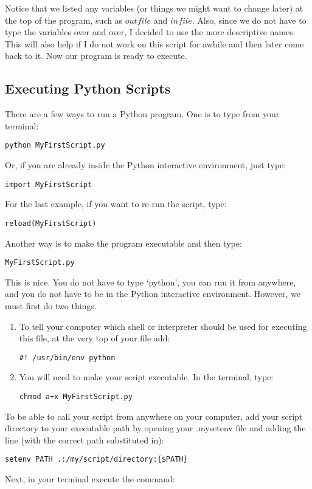 Notice that we listed any variables (or things we might want to change
later) at the top of the program, such as $outfile$ and $infile$.
Also, since we do not have to type the variables over and over, I
decided to use the more descriptive names.  This will also help if I
do not work on this script for awhile and then later come back to it.
Now our program is ready to execute.

\subsection{Executing Python Scripts}

There are a few ways to run a Python program.  One is to type from your terminal:

\texttt{\termtab python MyFirstScript.py}

Or, if you are already inside the Python interactive environment, just
type:

\texttt{\pytab import MyFirstScript}

For the last example, if you want to re-run the script, type:

\texttt{\pytab reload(MyFirstScript)}

Another way is to make the program executable and then type:

\texttt{\termtab MyFirstScript.py}

This is nice.  You do not have to type `python', you can run it from
anywhere, and you do not have to be in the Python interactive
environment.  However, we must first do two things.
\begin{enumerate}
\item To tell your computer which shell or interpreter should be used
  for executing this file, at the very top of your file add:

  \texttt{\#! /usr/bin/env python}

\item You will need to make your script executable.  In the terminal,
  type:

  \texttt{\termtab chmod a+x MyFirstScript.py}  
\end{enumerate}

To be able to call your script from anywhere on your computer, add
your script directory to your executable path by opening your
.mysetenv file and adding the line (with the correct path substituted
in):

\texttt{setenv PATH .:/my/script/directory:\{\$PATH\}}

Next, in your terminal execute the command:


